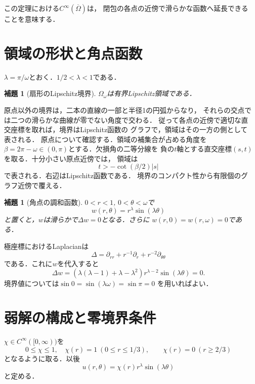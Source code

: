 \documentclass[a5paper,10pt,onecolumn]{jsarticle}
\makeatletter
\theoremstyle{mathnotetheorem}
\newtheorem{lemma}[theorem]{補題}
\renewcommand{\proofname}{証明}
\renewenvironment{proof}[1][\proofname]{%
  \par\pushQED{\qed}\normalfont\topsep4\p@\@plus2\p@\relax
  \trivlist\item[\hskip\labelsep\bfseries #1]\ignorespaces
}{\popQED\endtrivlist\@endpefalse}
\makeatother
\begin{document}
この定理における$C^\infty(\overline\Omega)$は，
閉包の各点の近傍で滑らかな函数へ延長できることを意味する．

\section{領域の形状と角点函数}
$\lambda=\pi/\omega$とおく．$1/2<\lambda<1$である．

\begin{lemma}[扇形のLipschitz境界]\label{corner:lem:lipschitz}
$\Omega_\omega$は有界Lipschitz領域である．
\end{lemma}
\begin{proof}
原点以外の境界は，二本の直線の一部と半径1の円弧からなり，
それらの交点では二つの滑らかな曲線が零でない角度で交わる．
従って各点の近傍で適切な直交座標を取れば，境界はLipschitz函数の
グラフで，領域はその一方の側として表される．
原点について確認する．領域の補集合が占める角度を
$\beta=2\pi-\omega\in(0,\pi)$とする．欠損角の二等分線を
負の$t$軸とする直交座標$(s,t)$を取る．十分小さい原点近傍では，
領域は
\[
 t>-\cot(\beta/2)|s|
\]
で表される．右辺はLipschitz函数である．
境界のコンパクト性から有限個のグラフ近傍で覆える．
\end{proof}

\begin{lemma}[角点の調和函数]\label{corner:lem:harmonic}
$0<r<1$, $0<\theta<\omega$で
\[
 w(r,\theta)=r^\lambda\sin(\lambda\theta)
\]
と置くと，$w$は滑らかで$\Delta w=0$となる．さらに
$w(r,0)=w(r,\omega)=0$である．
\end{lemma}
\begin{proof}
極座標におけるLaplacianは
\[
 \Delta=\partial_{rr}+r^{-1}\partial_r+r^{-2}\partial_{\theta\theta}
\]
である．これに$w$を代入すると
\[
 \Delta w=(\lambda(\lambda-1)+\lambda-\lambda^2)
 r^{\lambda-2}\sin(\lambda\theta)=0.
\]
境界値については$\sin0=\sin(\lambda\omega)=\sin\pi=0$
を用いればよい．
\end{proof}

\section{弱解の構成と零境界条件}
$\chi\in C^\infty([0,\infty))$を
\[
 0\le\chi\le1,\quad
 \chi(r)=1\ (0\le r\le1/3),\qquad
 \chi(r)=0\ (r\ge2/3)
\]
となるように取る．以後
\[
 u(r,\theta)=\chi(r)r^\lambda\sin(\lambda\theta)
\]
と定める．
\end{document}
